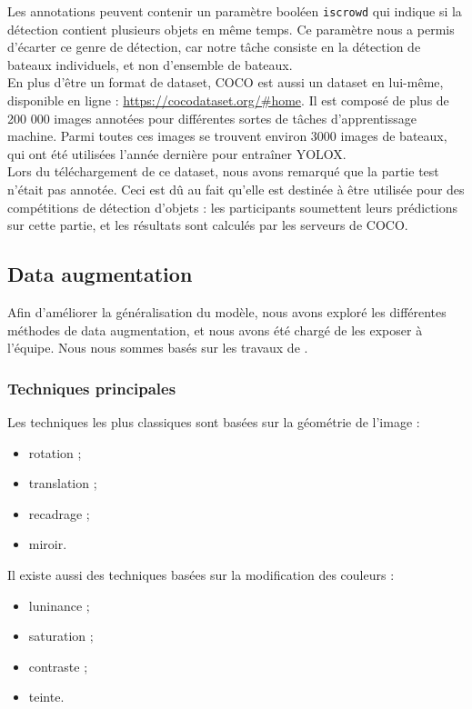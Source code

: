 Les annotations peuvent contenir un paramètre booléen \texttt{iscrowd} qui indique si
la détection contient plusieurs objets en même temps. Ce paramètre nous a permis d'écarter
ce genre de détection, car notre tâche consiste en la détection de bateaux individuels,
et non d'ensemble de bateaux. \\

En plus d'être un format de dataset, COCO est aussi un dataset en lui-même, disponible
en ligne : \url{https://cocodataset.org/#home}.
Il est composé de plus de 200 000 images annotées pour différentes sortes de tâches d'apprentissage machine.
Parmi toutes ces images se trouvent environ 3000 images de bateaux, qui ont été utilisées
l'année dernière pour entraîner YOLOX. \\

Lors du téléchargement de ce dataset, nous avons remarqué que la partie test n'était pas annotée.
Ceci est dû au fait qu'elle est destinée à être utilisée pour des compétitions de détection d'objets :
les participants soumettent leurs prédictions sur cette partie, et les résultats sont calculés par les
serveurs de COCO.\\

\subsection{Data augmentation}

Afin d'améliorer la généralisation du modèle, nous avons exploré les différentes méthodes de data augmentation,
et nous avons été chargé de les exposer à l'équipe. Nous nous sommes basés
sur les travaux de \cite{Mumuni_Mumuni_2022}.

\subsubsection{Techniques principales}

Les techniques les plus classiques sont basées sur la géométrie de l'image :
\begin{itemize}
    \item rotation ;
    \item translation ;
    \item recadrage ;
    \item miroir.
\end{itemize}

Il existe aussi des techniques basées sur la modification des couleurs :
\begin{itemize}
    \item luninance ;
    \item saturation ;
    \item contraste ;
    \item teinte.
\end{itemize}

